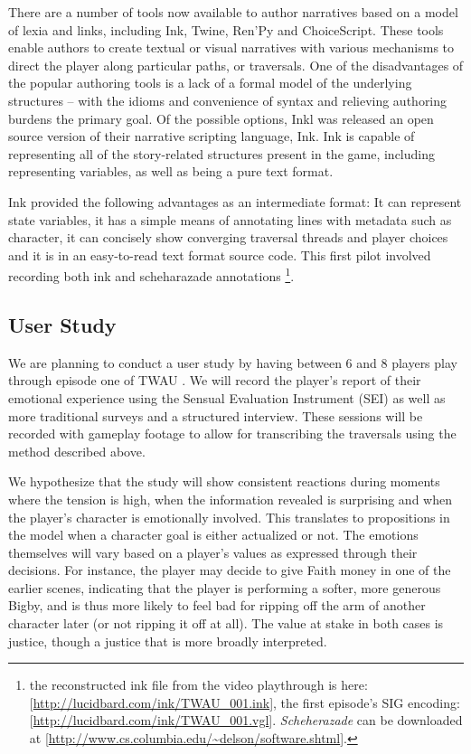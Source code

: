 There are a number of tools now available to author narratives based
on a model of lexia and links, including Ink, Twine, Ren'Py and
ChoiceScript. These tools enable authors to create textual or visual
narratives with various mechanisms to direct the player along
particular paths, or traversals. One of the disadvantages of the
popular authoring tools is a lack of a formal model of the underlying
structures -- with the idioms and convenience of syntax and relieving
authoring burdens the primary goal. Of the possible options, Inkl was
released an open source version of their narrative scripting language,
Ink. Ink is capable of representing all of the story-related
structures present in the game, including representing variables, as
well as being a pure text format.

Ink provided the following advantages as an intermediate format: It
can represent state variables, it has a simple means of annotating
lines with metadata such as character, it can concisely show
converging traversal threads and player choices and it is in an
easy-to-read text format source code. This first pilot involved
recording both ink and scheharazade annotations \footnote{the reconstructed ink file from the video playthrough is here:
[\url{http://lucidbard.com/ink/TWAU_001.ink}], the first episode's SIG
encoding: [\url{http://lucidbard.com/ink/TWAU_001.vgl}]. \emph{Scheherazade} can
be downloaded at [\url{http://www.cs.columbia.edu/~delson/software.shtml}].}.

\subsection{User Study}
\label{sec:orgheadline6}
We are planning to conduct a user study by having between 6 and 8
players play through episode one of TWAU . We will record the player's
report of their emotional experience using the Sensual Evaluation
Instrument (SEI) \cite{Laaksolahti2009-uw} as well as more traditional
surveys and a structured interview. These sessions will be recorded
with gameplay footage to allow for transcribing the traversals using
the method described above.

We hypothesize that the study will show consistent reactions during
moments where the tension is high, when the information revealed is
surprising and when the player's character is emotionally
involved. This translates to propositions in the model when a
character goal is either actualized or not. The emotions themselves
will vary based on a player's values as expressed through their
decisions. For instance, the player may decide to give Faith money in
one of the earlier scenes, indicating that the player is performing a
softer, more generous Bigby, and is thus more likely to feel bad for
ripping off the arm of another character later (or not ripping it off
at all). The value at stake in both cases is justice, though a justice
that is more broadly interpreted.

